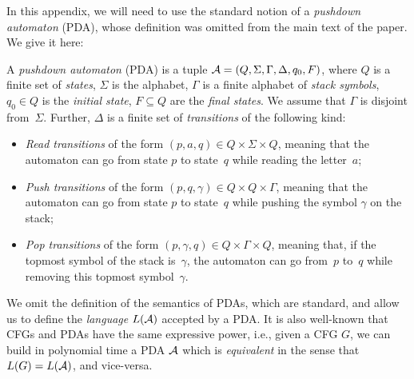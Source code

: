 %

In this appendix, we will need to use the standard notion of a \emph{pushdown
automaton} (PDA), whose definition was omitted from the main text of the paper.
We give it here:

\begin{definition}
  \label{def:pda}
  A \emph{pushdown automaton} (PDA) is a tuple $\mathcal{A} = (Q, \Sigma, \Gamma, \Delta,
  q_0, F)$, where $Q$ is a finite set of \emph{states}, $\Sigma$ is the
  alphabet, $\Gamma$ is a finite alphabet of \emph{stack symbols}, $q_0 \in Q$
  is the \emph{initial state}, $F \subseteq Q$ are the \emph{final states}. We
  assume that $\Gamma$ is disjoint from~$\Sigma$. Further, $\Delta$ is a finite
  set of \emph{transitions} of the following kind:
  \begin{itemize}
    \item \emph{Read transitions} of the form $(p, a, q) \in Q \times \Sigma
      \times Q$, meaning that the automaton can go from state $p$ to
      state~$q$ while reading the letter~$a$;
    \item \emph{Push transitions} of the form $(p, q, \gamma) \in Q \times Q
      \times \Gamma$, meaning that the automaton can go from state $p$ to
      state~$q$ while pushing the symbol $\gamma$ on the stack;
    \item \emph{Pop transitions} of the form $(p, \gamma, q) \in Q \times \Gamma
      \times Q$, meaning that, if the topmost symbol of the stack is~$\gamma$,
      the automaton can go from~$p$ to~$q$ while removing this topmost
      symbol~$\gamma$.
  \end{itemize}
\end{definition}

We omit the definition of the semantics of PDAs, which are standard, and allow
us to define the \emph{language} $L(\mathcal{A})$ accepted by a PDA. It is also well-known
that CFGs and PDAs have the same expressive power, i.e., given a CFG $G$, we can
build in polynomial time a PDA $\mathcal{A}$ which is \emph{equivalent} in the sense that
$L(G) = L(\mathcal{A})$, and vice-versa.

%

